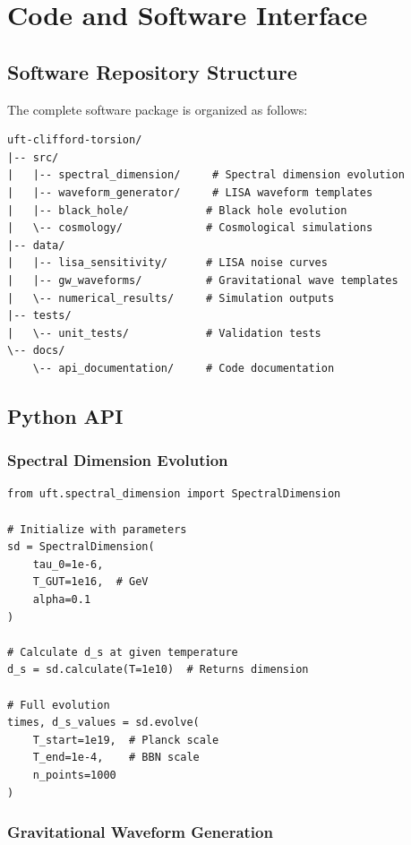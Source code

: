 \chapter{Code and Software Interface}
\label{app:code}

\section{Software Repository Structure}

The complete software package is organized as follows:

\begin{verbatim}
uft-clifford-torsion/
|-- src/
|   |-- spectral_dimension/     # Spectral dimension evolution
|   |-- waveform_generator/     # LISA waveform templates
|   |-- black_hole/            # Black hole evolution
|   \-- cosmology/             # Cosmological simulations
|-- data/
|   |-- lisa_sensitivity/      # LISA noise curves
|   |-- gw_waveforms/          # Gravitational wave templates
|   \-- numerical_results/     # Simulation outputs
|-- tests/
|   \-- unit_tests/            # Validation tests
\-- docs/
    \-- api_documentation/     # Code documentation
\end{verbatim}

\section{Python API}

\subsection{Spectral Dimension Evolution}

\begin{verbatim}
from uft.spectral_dimension import SpectralDimension

# Initialize with parameters
sd = SpectralDimension(
    tau_0=1e-6,
    T_GUT=1e16,  # GeV
    alpha=0.1
)

# Calculate d_s at given temperature
d_s = sd.calculate(T=1e10)  # Returns dimension

# Full evolution
times, d_s_values = sd.evolve(
    T_start=1e19,  # Planck scale
    T_end=1e-4,    # BBN scale
    n_points=1000
)
\end{verbatim}

\subsection{Gravitational Waveform Generation}

